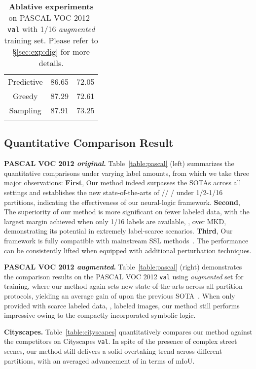 \documentclass[10pt,twocolumn,letterpaper]{article}
\begin{document}
\begin{table*}[t]
{\begin{tabular}{|c||cc|}
         Predictive & 86.65 & 72.05 \\
			Greedy & 87.29 & 72.61 \\
			Sampling & 87.91 & 73.25 \\
			\hline
			\multicolumn{2}{c}{}
		\end{tabular}
	}\hfill
	\vspace{-1pt}
	\captionsetup{font=small}
   \caption{\small \textbf{Ablative experiments} on PASCAL VOC 2012~\cite{everingham2015pascal} \texttt{val} with 1/16 \textit{augmented} training set. Please refer to \S\ref{sec:exp:dig} for more details.}
	\label{tab:ablations}
	\vspace{-2pt}
\end{table*}


\subsection{Quantitative Comparison Result}\label{sec:exp:seg}

\noindent\textbf{PASCAL VOC 2012 \textit{original}.} Table~\ref{table:pascal} (left) summarizes the quantitative comparisons under varying label amounts, from which we take three major observations:
\textbf{First}, Our method indeed surpasses the SOTAs across all settings and establishes the new state-of-the-arts of // / under 1/2-1/16 partitions, indicating the effectiveness of our neural-logic framework.
\textbf{Second}, The superiority of our method is more significant on fewer labeled data, with the largest margin achieved when only 1/16 labels are available, \ie,  over MKD, demonstrating its potential in extremely label-scarce scenarios.
\textbf{Third}, Our framework is fully compatible with mainstream SSL methods~\cite{yuan2022semi,wang2022semi}. The performance can be consistently lifted when equipped with additional perturbation techniques.

\noindent\textbf{PASCAL VOC 2012 \textit{augmented}.} Table~\ref{table:pascal} (right) demonstrates the comparison results on the PASCAL VOC 2012 \texttt{val} using \textit{augmented} set for training, where our method again sets new state-of-the-arts across all partition protocols, yielding an average gain of  upon the previous SOTA~\cite{yuan2022semi}.
When only provided with scarce labeled data, \ie,  labeled images, our method still performs impressive owing to the compactly incorporated symbolic logic.

\noindent\textbf{Cityscapes.} Table~\ref{table:cityscapes} quantitatively compares our method against the competitors on Cityscapes \texttt{val}. In spite of the presence of complex street scenes, our method still delivers a solid overtaking trend across different partitions, with an averaged advancement of  in terms of mIoU.
\end{document}
